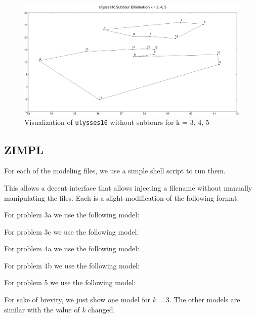 \documentclass[12pt,letterpaper]{article}
\begin{document}
\begin{enumerate}
      \begin{figure}
        \includegraphics[width=\textwidth]{distances/ulysses16_subtours_elimination_k.png}
        \caption{Visualization of \texttt{ulysses16} without subtours for k = 3, 4, 5}
        \label{fig:ulysses16eliminationk}
      \end{figure}
  \end{enumerate}

  \pagebreak

  \begin{appendices}
    \section{ZIMPL}
      For each of the modeling files,
      we use a simple shell script to run them.

      This allows a decent interface that allows injecting a filename without manually manipulating the files.
      Each is a slight modification of the following format.

      

      For problem 3a we use the following model:

      

      For problem 3c we use the following model:

      

      For problem 4a we use the following model:

      

      For problem 4b we use the following model:

      

      \pagebreak

      For problem 5 we use the following model:

      

      For sake of brevity, we just show one model for $k = 3$.
      The other models are similar with the value of $k$ changed.
  \end{appendices}
\end{document}
